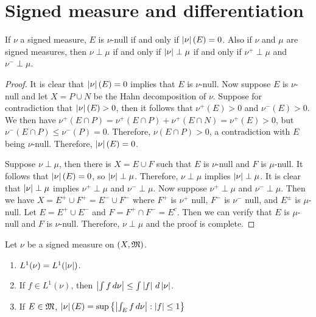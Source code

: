 \documentclass[a4paper]{article}
\begin{document}
\maketitle

\tableofcontents

\setcounter{section}{2}
\section{Signed measure and differentiation}

\begin{ex}[Folland 3.2]
If $\nu$ a signed measure, $E$ is $\nu$-null if and only if 
$\left\lvert \nu\right\rvert(E) = 0$. Also if $\nu$ and $\mu$ are signed measures,
then $\nu \perp \mu$ if and only if $\left\lvert \nu\right\rvert \perp \mu$ 
if and only if $\nu^+ \perp \mu$ and $\nu^- \perp \mu$.
\end{ex}

\begin{proof}
It is clear that $\left\lvert \nu\right\rvert(E) = 0$ implies that $E$ is $\nu$-null.
Now suppose $E$ is $\nu$-null and let $X = P \cup N$ be the 
Hahn decomposition of $\nu$. Suppose for contradiction 
that $\left\lvert \nu\right\rvert(E) > 0$, then it follows that 
$\nu^+(E) > 0$ and $\nu^- (E) > 0$. We then have 
$\nu^+(E \cap P) = \nu^+ (E \cap P) + \nu^+ (E \cap N) = \nu^+(E)
> 0$, but $\nu^- (E \cap P) \leq \nu^- (P) = 0$. Therefore, 
$\nu(E \cap P) > 0$, a contradiction with $E$ being $\nu$-null.
Therefore, $\left\lvert \nu\right\rvert(E) = 0$.

Suppose $\nu \perp \mu$, then there is $X = E \cup F$ such that 
$E$ is $\nu$-null and $F$ is $\mu$-null. It follows that 
$\left\lvert \nu\right\rvert(E) = 0$, so $\left\lvert \nu\right\rvert \perp \mu$. Therefore, 
$\nu \perp \mu$ implies $\left\lvert \nu\right\rvert \perp \mu$. It is clear 
that $\left\lvert \nu\right\rvert \perp \mu$ implies $\nu^+ \perp \mu$
and $\nu^- \perp \mu$. Now suppose 
$\nu^+ \perp \mu$ and $\nu^- \perp \mu$. Then we have 
$X = E^+ \cup F^+ = E^- \cup F^-$ where $F^+$ is $\nu^+$ null,
$F^-$ is $\nu^-$ null, and $E^\pm$ is $\mu$-null. Let 
$E = E^+ \cup E^-$ and $F = F^+ \cap F^- = E^c$. Then we can 
verify that $E$ is $\mu$-null and $F$ is $\nu$-null. Therefore, 
$\nu \perp \mu$ and the proof is complete.
\end{proof}

\begin{ex}[Folland 3.3]
Let $\nu$ be a signed measure on $(X, \mathfrak{M})$. 
\begin{enumerate}
  \item $L^1 (\nu) = L^1(\left\lvert \nu\right\rvert)$.
  \item If $f \in L^1 (\nu)$, then $\left\lvert \int f \, d \nu\right\rvert
  \leq \int \left\lvert f\right\rvert \, d \left\lvert \nu\right\rvert$.
  \item If $E \in \mathfrak{M}$, $\left\lvert \nu\right\rvert(E) = \sup 
  \left\{ \left\lvert \int_E f \, d \nu\right\rvert : \left\lvert f\right\rvert \leq 1 \right\}$
\end{enumerate}  
\end{ex}
\end{document}
